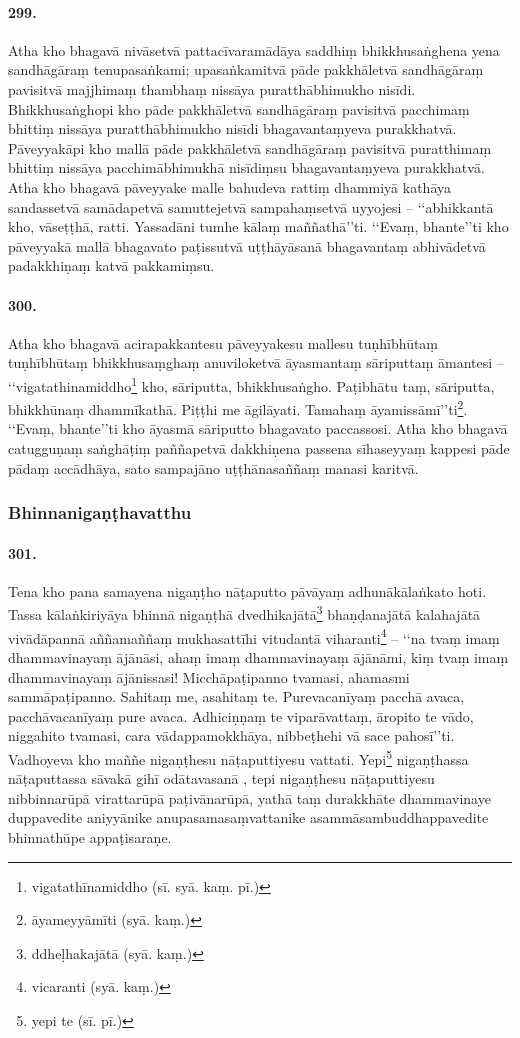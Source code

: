 \paragraph{299.} Atha kho bhagavā nivāsetvā pattacīvaramādāya saddhiṃ bhikkhusaṅghena yena sandhāgāraṃ tenupasaṅkami; upasaṅkamitvā pāde pakkhāletvā sandhāgāraṃ pavisitvā majjhimaṃ thambhaṃ nissāya puratthābhimukho nisīdi. Bhikkhusaṅghopi kho pāde pakkhāletvā sandhāgāraṃ pavisitvā pacchimaṃ bhittiṃ nissāya puratthābhimukho nisīdi bhagavantaṃyeva purakkhatvā. Pāveyyakāpi kho mallā pāde pakkhāletvā sandhāgāraṃ pavisitvā puratthimaṃ bhittiṃ nissāya pacchimābhimukhā nisīdiṃsu bhagavantaṃyeva purakkhatvā. Atha kho bhagavā pāveyyake malle bahudeva rattiṃ dhammiyā kathāya sandassetvā samādapetvā samuttejetvā sampahaṃsetvā uyyojesi – ‘‘abhikkantā kho, vāseṭṭhā, ratti. Yassadāni tumhe kālaṃ maññathā’’ti. ‘‘Evaṃ, bhante’’ti kho pāveyyakā mallā bhagavato paṭissutvā uṭṭhāyāsanā bhagavantaṃ abhivādetvā padakkhiṇaṃ katvā pakkamiṃsu.

\paragraph{300.} Atha kho bhagavā acirapakkantesu pāveyyakesu mallesu tuṇhībhūtaṃ tuṇhībhūtaṃ bhikkhusaṃghaṃ anuviloketvā āyasmantaṃ sāriputtaṃ āmantesi – ‘‘vigatathinamiddho\footnote{vigatathīnamiddho (sī. syā. kaṃ. pī.)} kho, sāriputta, bhikkhusaṅgho. Paṭibhātu taṃ, sāriputta, bhikkhūnaṃ dhammīkathā. Piṭṭhi me āgilāyati. Tamahaṃ āyamissāmī’’ti\footnote{āyameyyāmīti (syā. kaṃ.)}. ‘‘Evaṃ, bhante’’ti kho āyasmā sāriputto bhagavato paccassosi. Atha kho bhagavā catugguṇaṃ saṅghāṭiṃ paññapetvā dakkhiṇena passena sīhaseyyaṃ kappesi pāde pādaṃ accādhāya, sato sampajāno uṭṭhānasaññaṃ manasi karitvā.

\subsubsection{Bhinnanigaṇṭhavatthu}

\paragraph{301.} Tena kho pana samayena nigaṇṭho nāṭaputto pāvāyaṃ adhunākālaṅkato hoti. Tassa kālaṅkiriyāya bhinnā nigaṇṭhā dvedhikajātā\footnote{ddheḷhakajātā (syā. kaṃ.)} bhaṇḍanajātā kalahajātā vivādāpannā aññamaññaṃ mukhasattīhi vitudantā viharanti\footnote{vicaranti (syā. kaṃ.)} – ‘‘na tvaṃ imaṃ dhammavinayaṃ ājānāsi, ahaṃ imaṃ dhammavinayaṃ ājānāmi, kiṃ tvaṃ imaṃ dhammavinayaṃ ājānissasi! Micchāpaṭipanno tvamasi, ahamasmi sammāpaṭipanno. Sahitaṃ me, asahitaṃ te. Purevacanīyaṃ pacchā avaca, pacchāvacanīyaṃ pure avaca. Adhiciṇṇaṃ te viparāvattaṃ, āropito te vādo, niggahito tvamasi, cara vādappamokkhāya, nibbeṭhehi vā sace pahosī’’ti. Vadhoyeva kho maññe nigaṇṭhesu nāṭaputtiyesu vattati. Yepi\footnote{yepi te (sī. pī.)} nigaṇṭhassa nāṭaputtassa sāvakā gihī odātavasanā , tepi nigaṇṭhesu nāṭaputtiyesu nibbinnarūpā virattarūpā paṭivānarūpā, yathā taṃ durakkhāte dhammavinaye duppavedite aniyyānike anupasamasaṃvattanike asammāsambuddhappavedite bhinnathūpe appaṭisaraṇe.

